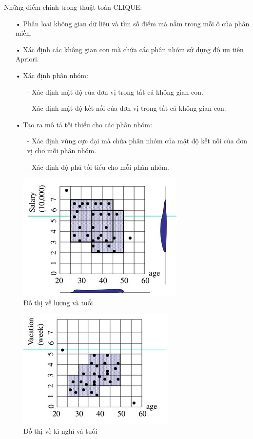 Những điểm chính trong thuật toán CLIQUE:
\begin{enumerate}
\item[•]Phân loại không gian dữ liệu và tìm số điểm mà nằm trong mỗi ô của phân miền.
\item[•]Xác định các không gian con mà chứa các phân nhóm sử dụng độ ưu tiên Apriori.
\item[•]Xác định phân nhóm:
\begin{enumerate}
\item[-]Xác định mật độ của đơn vị trong tất cả không gian con.
\item[-]Xác định mật độ kết nối của đơn vị trong tất cả không gian con.
\end{enumerate}
\item[•]Tạo ra mô tả tối thiểu cho các phân nhóm:
\begin{enumerate}
\item[-]Xác định vùng cực đại mà chứa phân nhóm của mật độ kết nối của đơn vị cho mỗi phân nhóm.
\item[-]Xác định độ phủ tối tiểu cho mỗi phân nhóm.
\end{enumerate}
\end{enumerate}

\begin{figure}[htp]
\centering
\includegraphics{Images/Clique_01}
\caption{Đồ thị về lương và tuổi}
\label{fig:Clique_01}
\end{figure}

\begin{figure}[htp]
\centering
\includegraphics{Images/Clique_02}
\caption{Đồ thị về kì nghỉ và tuổi}
\label{fig:Clique_02}
\end{figure}

